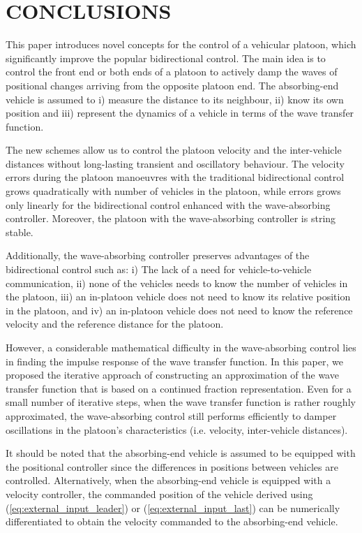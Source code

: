 \documentclass[final,5p,times,twocolumn]{elsarticle}
\begin{document}
\section{CONCLUSIONS}
This paper introduces novel concepts for the control of a vehicular platoon, which significantly improve the popular bidirectional control. The main idea is to control the front end or both ends of a platoon to actively damp the waves of positional changes arriving from the opposite platoon end. The absorbing-end vehicle is assumed to i) measure the distance to its neighbour, ii) know its own position and iii) represent the dynamics of a vehicle in terms of the wave transfer function.

The new schemes allow us to control the platoon velocity and the inter-vehicle distances without long-lasting transient and oscillatory behaviour. The velocity errors during the platoon manoeuvres with the traditional bidirectional control grows quadratically with number of vehicles in the platoon, while errors grows only linearly for the bidirectional control enhanced with the wave-absorbing controller. Moreover, the platoon with the wave-absorbing controller is string stable. 

Additionally, the wave-absorbing controller preserves advantages of the bidirectional control such as: i) The lack of a need for vehicle-to-vehicle communication, ii) none of the vehicles needs to know the number of vehicles in the platoon, iii) an in-platoon vehicle does not need to know its relative position in the platoon, and iv) an in-platoon vehicle does not need to know the reference velocity and the reference distance for the platoon.

However, a considerable mathematical difficulty in the wave-absorbing control lies in finding the impulse response of the wave transfer function. In this paper, we proposed the iterative approach of constructing an approximation of the wave transfer function that is based on a continued fraction representation. Even for a small number of iterative steps, when the wave transfer function is rather roughly approximated, the wave-absorbing control still performs efficiently to damper oscillations in the platoon's characteristics (i.e. velocity, inter-vehicle distances).

It should be noted that the absorbing-end vehicle is assumed to be equipped with the positional controller since the differences in positions between vehicles are controlled. Alternatively, when the absorbing-end vehicle is equipped with a velocity controller, the commanded position of the vehicle derived using (\ref{eq:external_input_leader}) or (\ref{eq:external_input_last}) can be numerically differentiated to obtain the velocity commanded to the absorbing-end vehicle.
\end{document}
